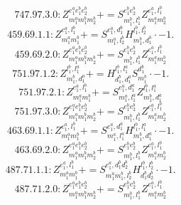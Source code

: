 \documentclass[letterpaper,10pt,fleqn,leqno,onecolumn]{article}
\begin{document}
\begin{equation} \;\;\;\;\;\;  747.97.3.0: Z^{e_{1}^{a}e_{1}^{b}e_{2}^{b}}_{m_{1}^{a}m_{1}^{b}m_{2}^{b}}+=S^{e_{1}^{b}e_{2}^{b}}_{m_{1}^{b},l_{1}^{b}}Z^{e_{1}^{a},l_{1}^{b}}_{m_{1}^{a}m_{2}^{b}} \end{equation}
\begin{equation} \;\;\;\;\;\;  459.69.1.1: Z^{e_{1}^{a},l_{1}^{b}}_{m_{1}^{a}m_{1}^{b}}+=S^{e_{1}^{a},d_{1}^{b}}_{m_{1}^{a},l_{2}^{b}}H^{l_{1}^{b},l_{2}^{b}}_{m_{1}^{b},d_{1}^{b}}\cdot -1. \end{equation}
\begin{equation} \;\;\;\;\;\;  459.69.2.0: Z^{e_{1}^{a}e_{1}^{b}e_{2}^{b}}_{m_{1}^{a}m_{1}^{b}m_{2}^{b}}+=S^{e_{1}^{b}e_{2}^{b}}_{m_{1}^{b},l_{1}^{b}}Z^{e_{1}^{a},l_{1}^{b}}_{m_{1}^{a}m_{2}^{b}} \end{equation}
\begin{equation} \;\;\;\;\;\;  751.97.1.2: Z^{l_{1}^{b},l_{1}^{a}}_{m_{1}^{b},d_{1}^{a}}+=H^{l_{1}^{b},l_{1}^{a}}_{d_{1}^{b},d_{1}^{a}}S^{d_{1}^{b}}_{m_{1}^{b}}\cdot -1. \end{equation}
\begin{equation} \;\;\;\;\;\;  751.97.2.1: Z^{e_{1}^{a},l_{1}^{b}}_{m_{1}^{a}m_{1}^{b}}+=S^{e_{1}^{a},d_{1}^{a}}_{m_{1}^{a},l_{1}^{a}}Z^{l_{1}^{b},l_{1}^{a}}_{m_{1}^{b},d_{1}^{a}} \end{equation}
\begin{equation} \;\;\;\;\;\;  751.97.3.0: Z^{e_{1}^{a}e_{1}^{b}e_{2}^{b}}_{m_{1}^{a}m_{1}^{b}m_{2}^{b}}+=S^{e_{1}^{b}e_{2}^{b}}_{m_{1}^{b},l_{1}^{b}}Z^{e_{1}^{a},l_{1}^{b}}_{m_{1}^{a}m_{2}^{b}} \end{equation}
\begin{equation} \;\;\;\;\;\;  463.69.1.1: Z^{e_{1}^{a},l_{1}^{b}}_{m_{1}^{a}m_{1}^{b}}+=S^{e_{1}^{a},d_{1}^{a}}_{m_{1}^{a},l_{1}^{a}}H^{l_{1}^{b},l_{1}^{a}}_{m_{1}^{b},d_{1}^{a}}\cdot -1. \end{equation}
\begin{equation} \;\;\;\;\;\;  463.69.2.0: Z^{e_{1}^{a}e_{1}^{b}e_{2}^{b}}_{m_{1}^{a}m_{1}^{b}m_{2}^{b}}+=S^{e_{1}^{b}e_{2}^{b}}_{m_{1}^{b},l_{1}^{b}}Z^{e_{1}^{a},l_{1}^{b}}_{m_{1}^{a}m_{2}^{b}} \end{equation}
\begin{equation} \;\;\;\;\;\;  487.71.1.1: Z^{e_{1}^{a},l_{1}^{b}}_{m_{1}^{a}m_{1}^{b}}+=S^{e_{1}^{a},d_{1}^{b}d_{2}^{b}}_{m_{1}^{a}m_{1}^{b},l_{2}^{b}}H^{l_{1}^{b},l_{2}^{b}}_{d_{1}^{b}d_{2}^{b}}\cdot -1. \end{equation}
\begin{equation} \;\;\;\;\;\;  487.71.2.0: Z^{e_{1}^{a}e_{1}^{b}e_{2}^{b}}_{m_{1}^{a}m_{1}^{b}m_{2}^{b}}+=S^{e_{1}^{b}e_{2}^{b}}_{m_{1}^{b},l_{1}^{b}}Z^{e_{1}^{a},l_{1}^{b}}_{m_{1}^{a}m_{2}^{b}} \end{equation}
\end{document}

